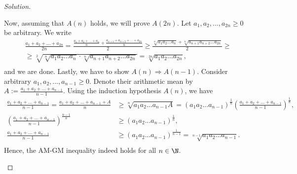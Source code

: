 \documentclass[a4paper, 12pt]{article}
\theoremstyle{plain}
\begin{document}
\begin{proof}[Solution]
\begin{itemize}
            Now, assuming that $A(n)$ holds, we will prove $A(2n)$. Let $a_1, a_2, ..., a_{2n} \geqslant 0$ be arbitrary. We write
            \begin{gather*}
                \frac{a_1 + a_2 + ... + a_{2n}}{2n} = \frac{\frac{a_1 + a_2 + ... + a_n}{n} + \frac{a_{n+1} + a_{n+2} + ... + a_{2n}}{n}}{2} \geqslant \frac{\sqrt[n]{a_1 a_2 ... a_n} + \sqrt[n]{a_{n+1} a_{n+2} ... a_{2n}}}{2} \geqslant \\[10pt]
                \geqslant \sqrt[2]{\sqrt[n]{a_1 a_2 ... a_n} \cdot \sqrt[n]{a_{n+1} a_{n+2} ... a_{2n}}} = \sqrt[2n]{a_1 a_2 ... a_{2n}},\\[-10pt]
            \end{gather*}
            and we are done. Lastly, we have to show $A(n) \Longrightarrow A(n-1)$. Consider arbitrary $a_1, a_2, ..., a_{n-1} \geqslant 0$. Denote their arithmetic mean by $A := \frac{a_1 + a_2 + ... + a_{n-1}}{n-1}$. Using the induction hypothesis $A(n)$, we have
            \begin{align*}
                \frac{a_1 + a_2 + ... + a_{n-1}}{n-1} = \frac{a_1 + a_2 + ... + a_{n-1} + A}{n} &\geqslant \sqrt[n]{a_1 a_2 ... a_{n-1} A} = (a_1 a_2 ... a_{n-1})^{\frac{1}{n}} \left(\frac{a_1 + a_2 + ... + a_{n-1}}{n-1}\right)^{\frac{1}{n}},\\[5pt]
                \left(\frac{a_1 + a_2 + ... + a_{n-1}}{n-1}\right)^{\frac{n-1}{n}} &\geqslant (a_1 a_2 ... a_{n-1})^{\frac{1}{n}},\\[10pt]
                \frac{a_1 + a_2 + ... + a_{n-1}}{n-1} &\geqslant (a_1 a_2 ... a_{n-1})^{\frac{1}{n-1}} = \sqrt[n-1]{a_1 a_2 ... a_{n-1}}.\\[-5pt]
            \end{align*}
            Hence, the AM-GM inequality indeed holds for all $n \in \N$.
    \end{itemize}
\end{proof}
\end{document}
